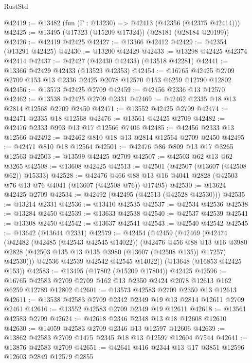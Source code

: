 \begin{lexlean}{RustStd}
\begin{coremodule}
@42419 := @13482 (fun (Γ : @13230) => @42413 (@42356 (@42375 @42414)))
@42425 := @13495 (@17323 (@15209 @17324)) (@28181 (@28184 @20199))
@42426 := @42419 @42425
@42427 := @13366 @42412
@42429 := @42354 (@13291 @42425)
@42430 := @13200 @42429
@42433 := @13298 @42425 @42374 @42414
@42437 := @42427 (@42430 @42433) (@13518 @42281)
@42441 := @13366 @42429 @42433 (@13523 @42353)
@42454 := @16765 @42425 @2709 @2709 @153 @13 @2336 @2425 @2078 @12570 @153 @6259 @12790 @12802
@42456 := @13573 @42425 @2709
@42459 := @42456 @2336 @13 @12570
@42462 := @13538 @42425 @2709 @2331
@42469 := @42462 @2335 @18 @13 @2814 @12568 @2709 @2450
@42471 := @13552 @42425 @2709
@42474 := @42471 @2335 @18 @12568
@42476 := @13561 @42425 @2709
@42482 := @42476 @2333 @993 @13 @17 @12566 @7406
@42485 := @42456 @2333 @13 @12566
@42492 := @42462 @810 @18 @13 @2814 @12564 @2709 @2450
@42495 := @42471 @810 @18 @12564
@42501 := @42476 @86 @809 @13 @17 @3265 @12563
@42503 := @13599 @42425 @2709
@42507 := @42503 @62 @13 @62 @3265
@42508 := @13608 @42425
@42513 := @42501 (@42507 (@13607 (@42508 @62)) @15333)
@42528 := @42476
    @466
    @88
    @13
    @16
    @4041
    @2828
    (@42503 @76 @13 @76 @4041 (@13607 (@42508 @76)) @17495)
@42530 := @13624 @42425 @2709
@42534 := @42492 (@42495 (@42513 (@42528 @42530)))
@42535 := @13214 @2331
@42536 := @13410 @42535
@42537 := @42534 @42536
@42538 := @13284 @2450
@42539 := @13633 @42538
@42540 := @42537 @42539
@42541 := @13308 @2450
@42542 := @13637 @42541
@42543 := @42540 @42542
@42545 := @13642 (@13644 @2331)
@42579 := @42454
    (@42459
      (@42469
        (@42474
          (@42482
            (@42485 (@42543 @42545 @14022))
            (@42476
              @456
              @88
              @13
              @16
              @3980
              @2828
              (@42503 @135 @13 @135 @3980 (@13607 (@42508 @135)) @17257)
              @42530)))
        @42536
        @42539
        @42542
        @42545
        @14022))
    (@13648 (@16853 @42425 @153))
@42583 := @13495 (@17802 (@15209 @17804)) @42425
@42596 := @16765 @42583 @2709 @2709 @162 @13 @2350 @2424 @2078 @12613 @162 @6259 @12789 @12802
@42601 := @13573 @42583 @2709 @2350 @13 @12613
@42611 := @13538 @42583 @2709 @2342 @2349 @19 @13 @2814 @12611 @2709 @2461
@42616 := @13552 @42583 @2709 @2349 @19 @12611
@42618 := @13561 @42583 @2709
@42624 := @42618 @2346 @2348 @13 @18 @12608 @12610
@42630 := @14059 @42583 @2709 @2346 @13 @12597 @12606
@42639 := @13862 @42583 @2709 @1475 @2345 @18 @13 @12597 @12604 @7544
@42641 := @13876 @42583 @2709
@42651 := @42641 @416 @2344 @13 @17 @3851 @12596 @12603 @2849 @12579 @2855

\end{coremodule}
\end{lexlean}
